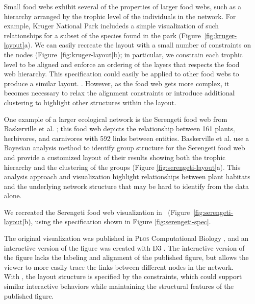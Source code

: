 Small food webs exhibit several of the properties of larger food webs, such as a hierarchy arranged by the trophic level of the individuals in the network. For example, Kruger National Park includeds a simple visualization of such relationships for a subset of the species found in the park (Figure~\ref{fig:kruger-layout}a). We can easily recreate the layout with a small number of constraints on the nodes (Figure~\ref{fig:kruger-layout}b); in particular, we constrain each trophic level to be aligned and enforce an ordering of the layers that respects the food web hierarchy. This \projectname specification could easily be applied to other food webs to produce a similar layout. . However, as the food web gets more complex, it becomes necessary to relax the alignment constraints or introduce additional clustering to highlight other structures within the layout. 

One example of a larger ecological network is the Serengeti food web from Baskerville et al. \cite{baskerville2011spatial}; this food web depicts the relationship between 161 plants, herbivores, and carnivores with 592 links between entities. Baskerville et al. use a Bayesian analysis method to identify group structure for the Serengeti food web and provide a customized layout of their results showing both the trophic hierarchy and the clustering of the groups (Figure \ref{fig:serengeti-layout}a). This analysis approach and visualization highlight relationships between plant habitats and the underlying network structure that may be hard to identify from the data alone.

We recreated the Serengeti food web visualization in \projectname~(Figure~\ref{fig:serengeti-layout}b), using the specification shown in Figure \ref{fig:serengeti-spec}.  

The original visualization was published in \textsc{Plos} Computational Biology \cite{baskerville2011spatial}, and an interactive version of the figure was created with D3 \cite{baskerville2011interactive}. The interactive version of the figure lacks the labeling and alignment of the published figure, but allows the viewer to more easily trace the links between different nodes in the network. With \projectname, the layout structure is specified by the constraints, which could support similar interactive behaviors while maintaining the structural features of the published figure.

